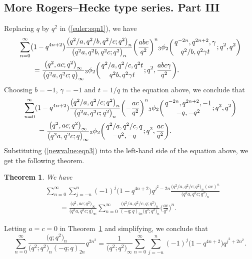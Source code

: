 \documentclass[10pt,a4paper]{amsart}
\numberwithin{equation}{section}
\newtheorem{Theorem}{Theorem}[section]
\begin{document}
\subsection{More Rogers--Hecke type series. Part III}
Replacing $q$ by $q^2$ in (\ref{euler:eqn1}), we have
\begin{align*}
	&\sum_{n=0}^\infty\bigl(1-q^{4n+2}\bigr) \frac{\bigl(q^2/a, q^2/b, q^2/c; q^2\bigr)_n}{\bigl(q^2a, q^2b, q^2c; q^2\bigr)_n} \biggl(\frac{abc}{q^2}\biggr)^n {_3\phi_2}\biggl({{q^{-2n}, q^{2n+2}, \gamma}\atop{q^2/b, q^2\gamma t}}; q^2, q^2\biggr)\nonumber\\
	&\qquad{}=\frac{\bigl(q^2, ac; q^2\bigr)_\infty}{\bigl(q^2a, q^2c; q\bigr)_\infty}
	{_3\phi_2}\biggl({{q^2/a, q^2/c, q^2t}\atop{q^2b, q^2\gamma t}}; q^2, \frac{abc\gamma}{q^2}\biggr).%
\end{align*}	
Choosing $b=-1$, $\gamma=-1$ and $t=1/q$ in the equation above, we conclude that
\begin{align*}%
& \sum_{n=0}^\infty(1-q^{4n+2}) \frac{\bigl(q^2/a, q^2/c; q^2\bigr)_n}{\bigl(q^2a, q^2c; q^2\bigr)_n} \biggl(-\frac{ac}{q^2}\biggr)^n {_3\phi_2}\biggl({{q^{-2n}, q^{2n+2}, -1}\atop{-q, -q^2}}; q^2, q^2\biggr)\\
&\qquad{}	=\frac{\bigl(q^2, ac; q^2\bigr)_\infty}{\bigl(q^2a, q^2c; q\bigr)_\infty}
	{_3\phi_2}\biggl({{q^2/a, q^2/c, q}\atop{-q^2, -q}}; q^2, \frac{ac}{q^2}\biggr).\nonumber
\end{align*}	
Substituting (\ref{newvalue:eqn3}) into the left-hand side of the equation above, we get the following theorem.
\begin{Theorem} \label{gaussthm}We have
\begin{align*}%
&\sum_{n=0}^\infty \sum_{j=-n}^n (-1)^j \bigl(1-q^{4n+2}\bigr)	q^{j^2-2n}
\frac{\bigl(q^2/a, q^2/c; q^2\bigr)_n (ac)^n}{\bigl(q^2a, q^2c; q^2\bigr)_n}\\
&\qquad{}=\frac{\bigl(q^2, ac; q^2\bigr)_\infty}{\bigl(q^2a, q^2c; q\bigr)_\infty}
\sum_{n=0}^\infty \frac{\bigl(q^2/a, q^2/c, q; q^2\bigr)_n}{(-q; q)_{2n} \bigl(q^2; q^2\bigr)_n}\biggl(\frac{ac}{q^2}\biggr)^n.
\nonumber
\end{align*}	
\end{Theorem}
Letting $a=c=0$ in Theorem~\ref{gaussthm} and simplifying, we conclude that
\begin{equation*}%
\sum_{n=0}^\infty \frac{\bigl(q; q^2\bigr)_n }{\bigl(q^2; q^2\bigr)_n (-q; q)_{2n}}q^{2n^2}
=\frac{1}{\bigl(q^2; q^2\bigr)_\infty}
\sum_{n=0}^\infty \sum_{j=-n}^n (-1)^j \bigl(1-q^{4n+2}\bigr) q^{j^2+2n^2}.
\end{equation*}
\end{document}
